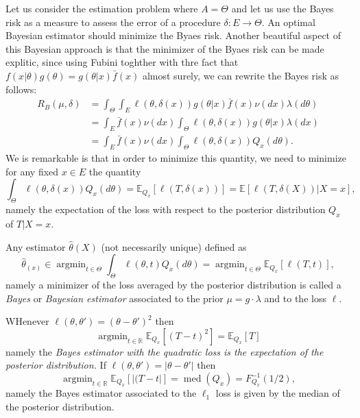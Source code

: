 \documentclass[
	fontsize=11pt, %
	twoside=false, %
	numbers=noenddot, %
]{kaobook}
\DeclareMathOperator{\med}{med}
\DeclareMathOperator*{\argmin}{argmin}
\newcommand{\E}{\mathbb E}
\newcommand{\R}{\mathbb R}
\newcommand{\wh}{\widehat}
\newcommand{\go}{\rightarrow}
\begin{document}
Let us consider the estimation problem where $A = \Theta$ and let us use the Bayes risk as a measure to assess the error of a procedure $\delta : E \go \Theta$.
An optimal Bayesian estimator should minimize the Byaes risk. 
Another beautiful aspect of this Bayesian approach is that the minimizer of the Byaes risk can be made explitic, since using Fubini toghther with thre fact that $f(x | \theta) g(\theta) = g(\theta | x) \bar f(x)$ almost surely, we can rewrite the Bayes risk as follows:
\begin{align*}
	R_B(\mu, \delta) &= \int_{\Theta} \int_E \ell(\theta, \delta(x)) g(\theta | x) \bar f(x) \nu(dx) \lambda(d \theta) \\
	&= \int_E \bar f(x) \nu(dx) \int_{\Theta} \ell(\theta, \delta(x)) g(\theta | x) \lambda(dx) \\
	&=  \int_E \bar f(x) \nu(dx) \int_{\Theta} \ell(\theta, \delta(x)) Q_x(d \theta).
\end{align*}
We is remarkable is that in order to minimize this quantity, we need to minimize for any fixed $x \in E$ the quantity
\begin{equation*}
	\int_{\Theta} \ell(\theta, \delta(x)) Q_x(d \theta) = \E_{Q_x} [\ell(T, \delta(x))] 
	= \E [\ell(T, \delta(X)) | X = x],
\end{equation*}
namely the expectation of the loss with respect to the posterior distribution $Q_x$ of $T | X = x$.
\begin{definition}
	Any estimator $\wh \theta(X)$ (not necessarily unique) defined as 
	\begin{equation*}
		\wh \theta_(x) \in \argmin_{t \in \Theta} \int_{\Theta} \ell(\theta, t) Q_x(d \theta) 
		= \argmin_{t \in \Theta} \E_{Q_x} [\ell(T, t) ],
	\end{equation*}
	namely a minimizer of the loss averaged by the posterior distribution is called a \emph{Bayes} or \emph{Bayesian estimator} associated to the prior $\mu = g \cdot \lambda$ and to the loss $\ell$.
\end{definition}

WHenever $\ell(\theta, \theta') = (\theta - \theta')^2$ then
\begin{equation*}
	\argmin_{t \in \R} \E_{Q_x}[ (T - t)^2] = \E_{Q_x}[T]
\end{equation*}
namely the \emph{Bayes estimator with the quadratic loss is the expectation of the posterior distribution.}
If $\ell(\theta, \theta') = |\theta - \theta'|$ then 
\begin{equation*}
	\argmin_{t \in \R} \E_{Q_x}[ |(T - t| ] = \med(Q_x) = F_{Q_x}^{-1}(1/2),
\end{equation*}
namely the Bayes estimator associated to the $\ell_1$ loss is given by the median of the posterior distribution. 
\end{document}
